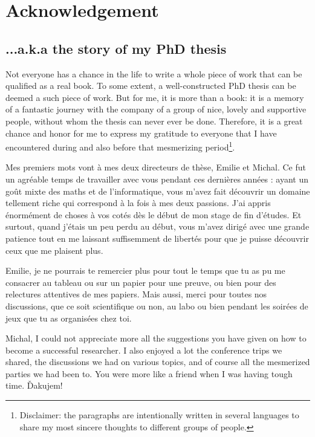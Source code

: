 \chapter*{Acknowledgement}

\section*{...a.k.a the story of my PhD thesis}

Not everyone has a chance in the life to write a whole piece of work that can be qualified as a real book. To some extent, a well-constructed PhD thesis can be deemed a such piece of work. But for me, it is more than a book: it is a memory of a fantastic journey with the company of a group of nice, lovely and supportive people, without whom the thesis can never ever be done. Therefore, it is a great chance and honor for me to express my gratitude to everyone that I have encountered during and also before that mesmerizing period\footnote{Disclaimer: the paragraphs are intentionally written in several languages to share my most sincere thoughts to different groups of people.}. 

Mes premiers mots vont \`a mes deux directeurs de thèse, Emilie et Michal. Ce fut un agr\'eable temps de travailler avec vous pendant ces derni\`eres années : ayant un go\^ut mixte des maths et de l'informatique, vous
m’avez fait d\'ecouvrir un domaine tellement riche qui correspond \`a la fois \`a mes deux passions. J’ai appris
\'enorm\'ement de choses à vos cotés d\`es le d\'ebut de mon stage de fin d'\'etudes. Et surtout, quand j'\'etais un peu perdu au d\'ebut, vous m'avez dirig\'e avec une grande patience tout en me laissant suffisemment de libert\'es pour que je puisse d\'ecouvrir ceux que me plaisent plus. 

Emilie, je ne pourrais te remercier plus pour tout le temps que tu as pu me consacrer au tableau ou sur un papier pour une preuve, ou bien pour des relectures attentives de mes papiers. Mais aussi, merci pour toutes nos discussions, que ce soit scientifique ou non, au labo ou bien pendant les soir\'ees de jeux que tu as organis\'ees chez toi. 

Michal, I could not appreciate more all the suggestions you have given on how to become a successful researcher. I also enjoyed a lot the conference trips we shared, the discussions we had on various topics, and of course all the mesmerized parties we had been to. You were more like a friend when I was having tough time. Ďakujem!

